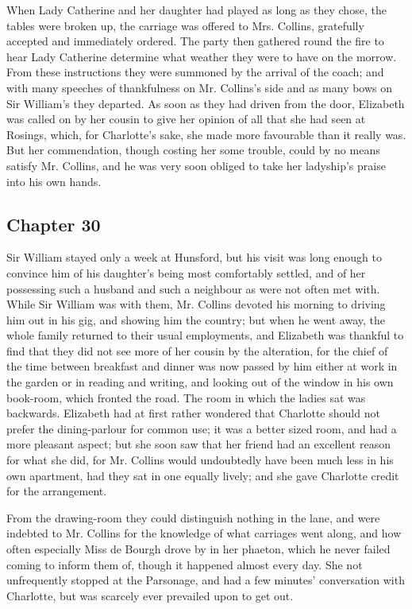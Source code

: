 When Lady Catherine and her daughter had played as long as they chose, the tables were broken up, the carriage was offered to Mrs. Collins, gratefully accepted and immediately ordered. The party then gathered round the fire to hear Lady Catherine determine what weather they were to have on the morrow. From these instructions they were summoned by the arrival of the coach; and with many speeches of thankfulness on Mr. Collins's side and as many bows on Sir William's they departed. As soon as they had driven from the door, Elizabeth was called on by her cousin to give her opinion of all that she had seen at Rosings, which, for Charlotte's sake, she made more favourable than it really was. But her commendation, though costing her some trouble, could by no means satisfy Mr. Collins, and he was very soon obliged to take her ladyship's praise into his own hands.

\subsection[chapter-30]{\useURL[url30][][][]\from[url30] Chapter 30}

Sir William stayed only a week at Hunsford, but his visit was long enough to convince him of his daughter's being most comfortably settled, and of her possessing such a husband and such a neighbour as were not often met with. While Sir William was with them, Mr. Collins devoted his morning to driving him out in his gig, and showing him the country; but when he went away, the whole family returned to their usual employments, and Elizabeth was thankful to find that they did not see more of her cousin by the alteration, for the chief of the time between breakfast and dinner was now passed by him either at work in the garden or in reading and writing, and looking out of the window in his own book-room, which fronted the road. The room in which the ladies sat was backwards. Elizabeth had at first rather wondered that Charlotte should not prefer the dining-parlour for common use; it was a better sized room, and had a more pleasant aspect; but she soon saw that her friend had an excellent reason for what she did, for Mr. Collins would undoubtedly have been much less in his own apartment, had they sat in one equally lively; and she gave Charlotte credit for the arrangement.

From the drawing-room they could distinguish nothing in the lane, and were indebted to Mr. Collins for the knowledge of what carriages went along, and how often especially Miss de Bourgh drove by in her phaeton, which he never failed coming to inform them of, though it happened almost every day. She not unfrequently stopped at the Parsonage, and had a few minutes' conversation with Charlotte, but was scarcely ever prevailed upon to get out.

